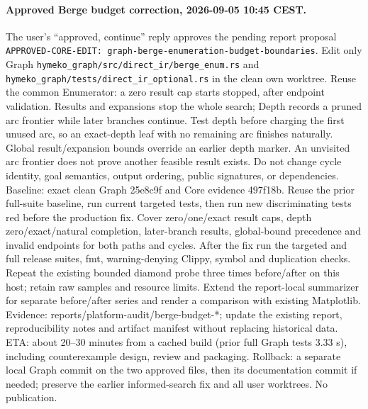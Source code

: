 \documentclass[10pt,a4paper]{article}
\begin{document}
\paragraph{Approved Berge budget correction, 2026-09-05 10:45 CEST.}
The user's ``approved, continue'' reply approves the pending report proposal
\texttt{APPROVED-CORE-EDIT: graph-berge-enumeration-budget-boundaries}.
Edit only Graph \texttt{hymeko\_graph/src/direct\_ir/berge\_enum.rs} and
\texttt{hymeko\_graph/tests/direct\_ir\_optional.rs} in the clean own worktree.
Reuse the common Enumerator: a zero result cap starts stopped, after endpoint
validation. Results and expansions stop the whole search; Depth records a pruned
arc frontier while later branches continue. Test depth before charging the first
unused arc, so an exact-depth leaf with no remaining arc finishes naturally.
Global result/expansion bounds override an earlier depth marker. An unvisited arc
frontier does not prove another feasible result exists. Do not change cycle
identity, goal semantics, output ordering, public signatures, or dependencies.
Baseline: exact clean Graph 25e8c9f and Core evidence 497f18b. Reuse the prior
full-suite baseline, run current targeted tests, then run new discriminating
tests red before the production fix. Cover zero/one/exact result caps, depth
zero/exact/natural completion, later-branch results, global-bound precedence and
invalid endpoints for both paths and cycles. After the fix run the targeted and
full release suites, fmt, warning-denying Clippy, symbol and duplication checks.
Repeat the existing bounded diamond probe three times before/after on this host;
retain raw samples and resource limits. Extend the report-local summarizer for
separate before/after series and render a comparison with existing Matplotlib.
Evidence: reports/platform-audit/berge-budget-*; update the existing report,
reproducibility notes and artifact manifest without replacing historical data.
ETA: about 20--30 minutes from a cached build (prior full Graph tests 3.33 s),
including counterexample design, review and packaging. Rollback: a separate local
Graph commit on the two approved files, then its documentation commit if needed;
preserve the earlier informed-search fix and all user worktrees. No publication.
\end{document}
